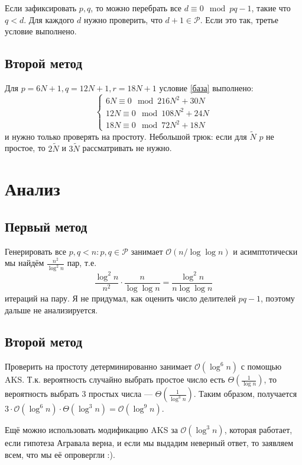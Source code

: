 Если зафиксировать \(p, q\), то можно перебрать все \(d \equiv 0 \mod pq - 1\), такие что \(q < d\). Для каждого \(d\) нужно проверить, что \(d + 1 \in \mathcal{P}\). Если это так, третье условие выполнено.

\subsection{Второй метод}

Для \(p = 6N + 1, q = 12N + 1, r = 18N + 1\) условие \eqref{база} выполнено:
\[\begin{cases}
        6N \equiv 0 \mod 216 N^2 + 30N   \\
        12N \equiv 0 \mod 108 N^2 + 24 N \\
        18N \equiv 0 \mod 72 N^2 + 18 N
    \end{cases} \]
и нужно только проверять на простоту. Небольшой трюк: если для \(\tilde{N}\) \(p\) не простое, то \(2\tilde{N}\) и \(3 \tilde{N}\) рассматривать не нужно.

\section{Анализ}

\subsection{Первый метод}

Генерировать все \(p, q < n : p,q\in \mathcal{P}\) занимает \(\mathcal{O}(n / \log \log n)\) и асимптотически мы найдём \(\frac{n^2}{\log^2 n}\) пар, т.е.
\[\frac{\log^2 n}{n^2} \cdot \frac{n}{\log \log n} = \frac{\log^2 n}{n \log \log n}\]
итераций на пару. Я не придумал, как оценить число делителей \(pq - 1\), поэтому дальше не анализируется.

\subsection{Второй метод}

Проверить на простоту детерминированно занимает \(\mathcal{O}(\log^6 n)\) с помощью AKS. Т.к. вероятность случайно выбрать простое число есть \(\Theta\left(\frac{1}{\log n}\right)\), то вероятность выбрать 3 простых числа --- \(\Theta\left(\frac{1}{\log^3 n}\right)\). Таким образом, получается \(3 \cdot \mathcal{O}(\log^6 n) \cdot \Theta(\log^3 n) = \mathcal{O}(\log^9 n)\).

Ещё можно использовать модификацию AKS за \(\mathcal{O}(\log^3 n)\), которая работает, если гипотеза Агравала верна, и если мы выдадим неверный ответ, то заявляем всем, что мы её опровергли :).

